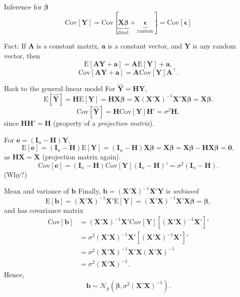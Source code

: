 \documentclass{beamer}
\newcommand{\E}{\mathrm{E}}
\newcommand{\Cov}{\mathrm{Cov}}
\begin{document}
\begin{frame}{Inference for $\boldsymbol\beta$}
$$
\Cov[\mathbf{Y}]=\Cov[\underbrace{\mathbf{X}\boldsymbol\beta}_{\text{fixed}}+\underbrace{\boldsymbol\epsilon}_{\text{random}}]=\Cov[\boldsymbol\epsilon]
$$

\hrulefill

Fact: If $\mathbf{A}$ is a constant matrix, $\mathbf{a}$ is a constant vector, and $\mathbf{Y}$ is any random vector, then
$$
\E[\mathbf{AY}+\mathbf{a}]=\mathbf{A}\E[\mathbf{Y}]+\mathbf{a},
$$
$$
\Cov[\mathbf{AY+a}]=\mathbf{A}\Cov[\mathbf{Y}]\mathbf{A}^\top.
$$
\end{frame}

\begin{frame}{Back to the general linear model}
For $\hat{\mathbf{Y}}=\mathbf{HY}$,
\pause $$
\E[\hat{\mathbf{Y}}]=\mathbf{H}\E[\mathbf{Y}]=\mathbf{HX}\boldsymbol{\beta}=\mathbf{X(X'X)}^{-1}\mathbf{X'X}\boldsymbol{\beta}=\mathbf{X}\boldsymbol{\beta}.
$$
\pause $$
\Cov[\hat{\mathbf{Y}}]=\mathbf{H}\Cov[\mathbf{Y}]\mathbf{H'}=\sigma^2\mathbf{H},
$$
\pause since $\mathbf{HH'}=\mathbf{H}$ (property of a {\it projection matrix}).

\pause For $\mathbf{e}=(\mathbf{I}_n-\mathbf{H})\mathbf{Y}$,
\pause $$
\E[\mathbf{e}]=(\mathbf{I}_n-\mathbf{H})\E[\mathbf{Y}]=(\mathbf{I}_n-\mathbf{H})\mathbf{X}\boldsymbol\beta=\mathbf{X}\boldsymbol\beta=\mathbf{X}\boldsymbol\beta-\mathbf{HX}\boldsymbol\beta=\mathbf{0},
$$
\pause as $\mathbf{HX}=\mathbf{X}$ (projection matrix again).
\pause $$
\Cov[\mathbf{e}]=(\mathbf{I}_n-\mathbf{H})\Cov[\mathbf{Y}](\mathbf{I}_n-\mathbf{H})'=\sigma^2(\mathbf{I}_n-\mathbf{H}).
$$
(Why?)
\end{frame}

\begin{frame}{Mean and variance of $\mathbf{b}$}
Finally, $\mathbf{b}=(\mathbf{X'X})^{-1}\mathbf{X'Y}$ is {\it unbiased}
$$
\E[\mathbf{b}]=(\mathbf{X'X})^{-1}\mathbf{X}'\E[\mathbf{Y}]=(\mathbf{X'X})^{-1}\mathbf{X'X}\boldsymbol\beta=\boldsymbol\beta,
$$
and has covariance matrix
\begin{align*}
\Cov[\mathbf{b}]&=(\mathbf{X'X})^{-1}\mathbf{X}'\Cov[\mathbf{Y}][(\mathbf{X'X})^{-1}\mathbf{X'}]'\\
&=\sigma^2(\mathbf{X'X})^{-1}\mathbf{X}'[(\mathbf{X'X})^{-1}\mathbf{X}']'\\
&=\sigma^2(\mathbf{X'X})^{-1}\mathbf{X'X}(\mathbf{X'X})^{-1}\\
&=\sigma^2(\mathbf{X'X})^{-1}.
\end{align*}
Hence,
$$
\mathbf{b}\sim\mathcal{N}_p(\boldsymbol\beta, \sigma^2(\mathbf{X'X})^{-1}).
$$
\end{frame}
\end{document}
